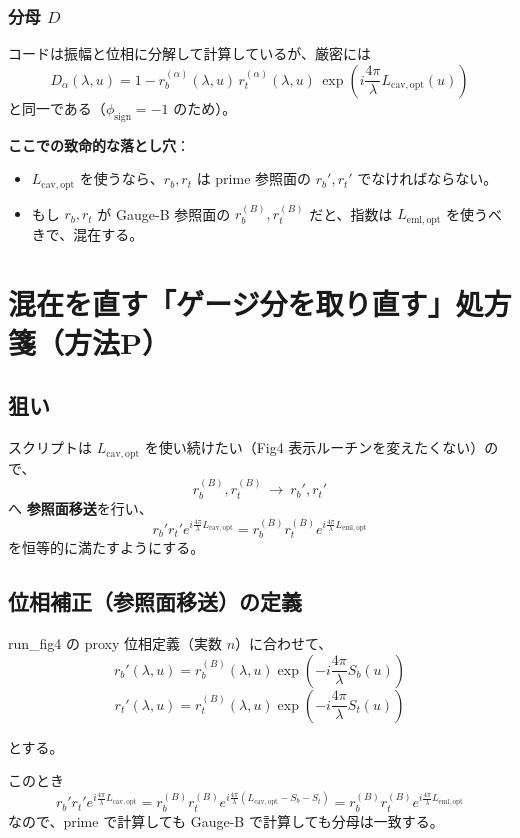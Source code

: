 \documentclass[a4paper,11pt]{article}
\begin{document}
\subsubsection{分母 \(D\)}
コードは振幅と位相に分解して計算しているが、厳密には
\[
\boxed{
D_\alpha(\lambda,u)=
1-r_b^{(\alpha)}(\lambda,u)\,r_t^{(\alpha)}(\lambda,u)\,
\exp\!\left(i\frac{4\pi}{\lambda}L_{\mathrm{cav,opt}}(u)\right)
}
\]
と同一である（\(\phi_{\mathrm{sign}}=-1\) のため）。

\bigskip
\noindent
\textbf{ここでの致命的な落とし穴}：
\begin{itemize}
\item \(L_{\mathrm{cav,opt}}\) を使うなら、\(r_b,r_t\) は prime 参照面の \(r_b',r_t'\) でなければならない。
\item もし \(r_b,r_t\) が Gauge-B 参照面の \(r_b^{(B)},r_t^{(B)}\) だと、指数は \(L_{\mathrm{eml,opt}}\) を使うべきで、混在する。
\end{itemize}

\section{混在を直す「ゲージ分を取り直す」処方箋（方法P）}

\subsection{狙い}
スクリプトは \(L_{\mathrm{cav,opt}}\) を使い続けたい（Fig4 表示ルーチンを変えたくない）ので、
\[
r_b^{(B)}, r_t^{(B)} \ \longrightarrow\ r_b', r_t'
\]
へ \textbf{参照面移送}を行い、
\[
r_b' r_t' e^{i\frac{4\pi}{\lambda}L_{\mathrm{cav,opt}}}
=
r_b^{(B)} r_t^{(B)} e^{i\frac{4\pi}{\lambda}L_{\mathrm{eml,opt}}}
\]
を恒等的に満たすようにする。

\subsection{位相補正（参照面移送）の定義}
run\_fig4 の proxy 位相定義（実数 \(n\)）に合わせて、
\begin{equation}    
r_b'(\lambda,u) = r_b^{(B)}(\lambda,u)\exp\!\left(-i\frac{4\pi}{\lambda}S_b(u)\right)
\end{equation}
\begin{equation}
r_t'(\lambda,u) = r_t^{(B)}(\lambda,u)\exp\!\left(-i\frac{4\pi}{\lambda}S_t(u)\right)
\end{equation}

とする。

このとき
\[
r_b' r_t' e^{i\frac{4\pi}{\lambda}L_{\mathrm{cav,opt}}}
=
r_b^{(B)} r_t^{(B)}
e^{i\frac{4\pi}{\lambda}(L_{\mathrm{cav,opt}}-S_b-S_t)}
=
r_b^{(B)} r_t^{(B)} e^{i\frac{4\pi}{\lambda}L_{\mathrm{eml,opt}}}
\]
なので、prime で計算しても Gauge-B で計算しても分母は一致する。
\end{document}
